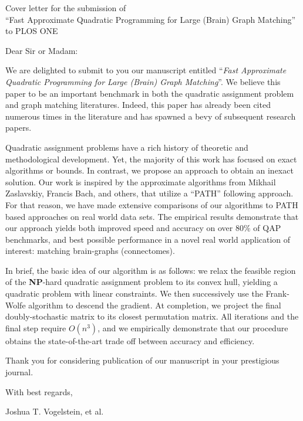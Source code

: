 \documentclass{letter}
\begin{document}
\address{Johns Hopkins University}

\begin{letter}
{
Cover letter for the submission of 
\\
``Fast Approximate Quadratic Programming for Large (Brain) Graph Matching''
\\
to PLOS ONE
}

\date{\today}

\opening{Dear Sir or Madam:}

\bigskip
 
We are delighted to submit to you our manuscript entitled ``\emph{Fast Approximate Quadratic Programming for Large (Brain) Graph Matching}''.
We believe this paper to be an important benchmark in both the quadratic assignment problem and graph matching literatures.  Indeed, this paper has already been cited numerous times in the literature and has spawned a bevy of subsequent research papers.  

Quadratic assignment problems have a rich history of theoretic and methodological development.  Yet, the majority of this work has focused on exact algorithms or bounds.  In contrast, we propose an approach  to obtain an inexact solution. 
Our work is inspired by the approximate algorithms 
from Mikhail Zaslavskiy, Francis Bach, and others,
that utilize a ``PATH'' following approach. For that reason, we have made extensive comparisons of our algorithms to PATH based approaches on real world data sets.  The empirical results demonstrate that our approach yields both improved speed and accuracy on over $80\%$ of QAP benchmarks, and best possible performance in a novel real world application of interest: matching brain-graphs (connectomes).

In brief, the basic idea of our algorithm is as follows: we relax the feasible region of the \textbf{NP}-hard quadratic assignment problem to its convex hull, yielding a quadratic problem with linear constraints.  We then successively use the Frank-Wolfe algorithm to descend the gradient.  At completion, we project the final doubly-stochastic matrix to its closest permutation matrix.  All iterations and the final step require $O(n^3)$,  and we empirically demonstrate that our procedure obtains the state-of-the-art trade off between accuracy and efficiency.

Thank you for considering publication of our manuscript in your prestigious journal.

With best regards,\\
\bigskip 

Joshua T. Vogelstein, et al.


\end{letter}
\end{document}

